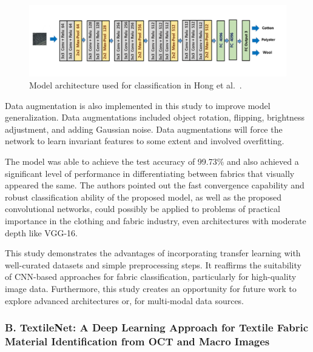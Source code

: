 \begin{figure}[H]
    \centering
    \begin{minipage}{1\linewidth}
        \includegraphics[width=\linewidth]{images/Paper1Model.png}
    \end{minipage}
    \caption[Model architecture - Hong et al.~\cite{hong2024research}]{Model architecture used for classification in Hong et al.~\cite{hong2024research}.}
\end{figure}

Data augmentation is also implemented in this study to improve model generalization. Data augmentations included object rotation, flipping, brightness adjustment, and adding Gaussian noise. Data augmentations will force the network to learn invariant features to some extent and involved overfitting.

The model was able to achieve the test accuracy of 99.73\% and also achieved a significant level of performance in differentiating between fabrics that visually appeared the same. The authors pointed out the fast convergence capability and robust classification ability of the proposed model, as well as the proposed convolutional networks, could possibly be applied to problems of practical importance in the clothing and fabric industry, even architectures with moderate depth like VGG-16.

This study demonstrates the advantages of incorporating transfer learning with well-curated datasets and simple preprocessing steps. It reaffirms the suitability of CNN-based approaches for fabric classification, particularly for high-quality image data. Furthermore, this study creates an opportunity for future work to explore advanced architectures or, for multi-modal data sources.

\subsubsection[B. TextileNet: A Deep Learning Approach for Textile Fabric Material Identification from OCT and Macro Images]{B. TextileNet: A Deep Learning Approach for Textile Fabric Material Identification from OCT and Macro Images~\cite{siam2023textilenet}}

